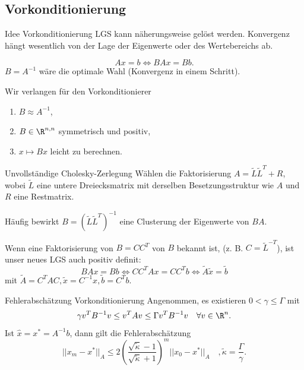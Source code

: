 \subsection{Vorkonditionierung}

\begin{karte}{Idee Vorkonditionierung}
    LGS kann näherungsweise gelöst werden. 
    Konvergenz hängt wesentlich von der Lage 
    der Eigenwerte oder des Wertebereichs ab. 

    \[ A x = b \Leftrightarrow BAx = Bb. \]
    \(B = A^{-1}\) wäre die optimale Wahl (Konvergenz in einem Schritt).

    Wir verlangen für den Vorkonditionierer
    \begin{enumerate}
        \item \(B \approx A^{-1}\),
        \item \( B \in \R^{n,n} \) symmetrisch und positiv,
        \item \(x \mapsto Bx\) leicht zu berechnen.
    \end{enumerate}   
\end{karte}

\begin{karte}{Unvollständige Cholesky-Zerlegung}
    Wählen die Faktorisierung \( A = \tilde{L} \tilde{L}^T + R \), 
    wobei \(\tilde{L}\) eine untere Dreiecksmatrix mit derselben Besetzungsstruktur 
    wie \(A\) und \(R\) eine Restmatrix.

    Häufig bewirkt \( B = (\tilde{L} \tilde{L}^T)^{-1} \) eine Clusterung 
    der Eigenwerte von \(BA\).

    Wenn eine Faktorisierung von \(B = C C^T\) von \(B\) bekannt ist, 
    (z. B. \(C = \tilde{L}^{-T}\)), ist unser neues LGS auch positiv definit: 
    \[ B Ax = Bb \Leftrightarrow C C^T A x = C C^T b \Leftrightarrow \tilde{A} \tilde{x} = \tilde{b} \]
    mit \( \tilde{A} = C^T A C, \tilde{x} = C^{-1} x, \tilde{b} = C^T b \).
\end{karte}

\begin{karte}{Fehlerabschätzung Vorkonditionierung}
    Angenommen, es existieren \( 0 < \gamma \leq \Gamma \) mit 
    \[ \gamma v^T B^{-1} v \leq v^T A v \leq \Gamma v^T B^{-1} v \quad \forall v\in\R^n. \]
    Ist \( \widehat{x} = x^* = A^{-1}b \), dann gilt die Fehlerabschätzung 
    \[ ||x_m - x^*||_A \leq 2 \left( \frac{\sqrt{\tilde{\kappa}} - 1}{\sqrt{\tilde{\kappa}} + 1} \right)^m 
    ||x_0 - x^*||_A \quad, \tilde{\kappa} = \frac{\Gamma}{\gamma}. \]
\end{karte}